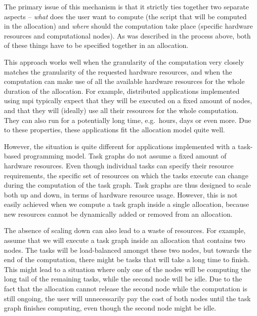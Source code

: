 The primary issue of this mechanism is that it strictly ties together two separate aspects --
\emph{what} does the user want to compute (the script that will be computed in the
allocation) and \emph{where} should the computation take place (specific hardware
resources and computational nodes). As was described in the process above, both of these things
have to be specified together in an allocation.


This approach works well when the granularity of the computation very closely matches the
granularity of the requested hardware resources, and when the computation can make use of all the
available hardware resources for the whole duration of the allocation. For example, distributed
applications implemented using \gls{mpi} typically expect that they will be executed
on a fixed amount of nodes, and that they will (ideally) use all their resources for the whole
computation. They can also run for a potentially long time, e.g.\ hours, days or even more. Due to
these properties, these applications fit the allocation model quite well.

However, the situation is quite different for applications implemented with a task-based
programming model. Task graphs do not assume a fixed amount of hardware resources. Even though
individual tasks can specify their resource requirements, the specific set of resources on which
the tasks execute can change during the computation of the task graph. Task graphs are thus
designed to scale both up and down, in terms of hardware resource usage. However, this is not
easily achieved when we compute a task graph inside a single allocation, because new resources
cannot be dynamically added or removed from an allocation.

The absence of scaling down can also lead to a waste of resources. For example, assume that we will
execute a task graph inside an allocation that contains two nodes. The tasks will be load-balanced
amongst these two nodes, but towards the end of the computation, there might be tasks that will
take a long time to finish. This might lead to a situation where only one of the nodes will be
computing the long tail of the remaining tasks, while the second node will be idle. Due to the fact
that the allocation cannot release the second node while the computation is still ongoing, the user
will unnecessarily pay the cost of both nodes until the task graph finishes computing, even though
the second node might be idle.

